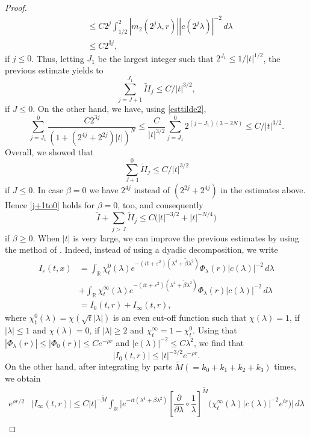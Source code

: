 \documentclass[10pt,leqno]{amsart}
\newcommand{\huom}[2][1=]{\todo[linecolor=red,backgroundcolor=red!10,bordercolor=red,#1]{#2}}
\numberwithin{equation}{section}
\newcommand{\field}[1]{\mathbb{#1}}
\newcommand{\R}{\field{R}}          		%
\begin{document}
\begin{proof}
\begin{align*}
&\leq C 2^j \int_{1/2}^2 |m_2 (2^j \lambda ,r)| |c(2^j \lambda) |^{-2}\, d\lambda \\
&\leq C 2^{3j}, 
\end{align*}
if $j\leq 0$.
Thus, letting $J_1$ be the largest integer such that 
$2^{J_1}\le 1/|t|^{1/2}$, the previous estimate yields to 
\[
\sum_{j=J+1}^{J_1} \widetilde{II}_j\leq C/|t|^{3/2},
\]
 if $J\leq 0$. On the other hand, we have, using \eqref{esttilde2}, 
$$\sum_{j=J_1}^0 \frac{C2^{3j}}{( 1+(2^{4j}+2^{2j}) |t|)^N}\leq \frac{C}{|t|^{3/2}} \sum_{j=J_1}^0 2^{(j-J_1)(3-2N)}
\leq C /|t|^{3/2}. $$
Overall, we showed that
\begin{equation}\label{j+1to0}
\sum_{J+1}^0 \widetilde{II}_j\le C/|t|^{3/2}
\end{equation}
if $J\le 0$.  %
In case $\beta=0$ we have $2^{4j}$ instead of $(2^{2j} +2^{4j})$ in the estimates above. Hence 
\eqref{j+1to0} holds for $\beta=0$, too, and consequently
\[
\tilde{I}+\sum_{j>J}\widetilde{II}_j \le
C \big(|t|^{-3/2}+|t|^{-N/4}\big)
\] 
if $\beta\ge 0$.
When $|t|$ is very large, we can improve the previous estimates by using the method of \cite{AMPVZ}. Indeed, instead of using a dyadic decomposition, we write
\begin{align*}
I_\varepsilon (t,x)&= \int_{\R} \chi^0_t (\lambda)  e^{-(it+\varepsilon^2) (\lambda^4 +\tilde{\beta} \lambda^2 ) } \Phi_\lambda (r) |c(\lambda)|^{-2}\, d\lambda  \\
&+ \int_{\R} \chi^\infty_t (\lambda)  e^{-(it+\varepsilon^2) (\lambda^4 +\tilde{\beta} \lambda^2 ) } \Phi_\lambda (r) |c(\lambda)|^{-2}\, d\lambda\\
&= I_0 (t,r) +I_\infty (t,r),
\end{align*}
where $\chi_t^0 (\lambda) = \chi (\sqrt{t} |\lambda|)$ is an even cut-off function such that $\chi (\lambda)=1$, if $|\lambda| \leq 1$ and $\chi (\lambda)=0$, if $|\lambda| \geq 2$ and $\chi_t^\infty =1-\chi_t^0$. Using that   $|\Phi_\lambda (r)|\leq |\Phi_0 (r)|\leq C e^{-\rho r}$ and $|c(\lambda)|^{-2}\leq C\lambda^2$, we find that
$$|I_0 (t,r)|\leq |t|^{-3/2}e^{-\rho r}. $$
On the other hand, after integrating by parts $\tilde{M} (=k_0+k_1+k_2+k_3)$ times, we obtain
\begin{align*}
e^{\rho r/2}&|I_\infty (t,r)| \leq C |t|^{-\tilde{M}} \int_{\R} \Big|e^{-it (\lambda^4 +\beta\lambda^2 )}  \left[ \dfrac{\partial}{\partial \lambda} \circ \dfrac{1}{\lambda}\right]^{\tilde{M}} \big(\chi_t^\infty (\lambda ) |c(\lambda)|^{-2} e^{ir}\big)\Big|\, d\lambda\\

\end{align*}
\end{proof}
\end{document}
